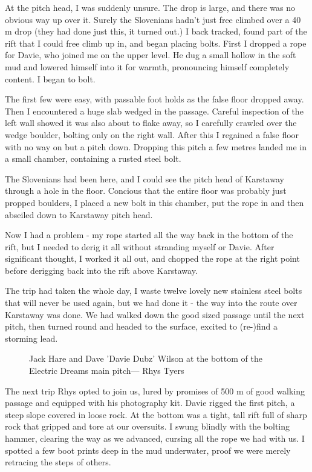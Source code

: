 At the pitch head, I was suddenly unsure. The drop is large, and there was no obvious way up over it. Surely the Slovenians hadn’t just free climbed over a 40 m drop (they had done just this, it turned out.) I back tracked, found part of the rift that I could free climb up in, and began placing bolts. First I dropped a rope for Davie, who joined me on the upper level. He dug a small hollow in the soft mud and lowered himself into it for warmth, pronouncing himself completely content. I began to bolt.

The first few were easy, with passable foot holds as the false floor dropped away. Then I encountered a huge slab wedged in the passage. Careful inspection of the left wall showed it was also about to flake away, so I carefully crawled over the wedge boulder, bolting only on the right wall. After this I regained a false floor with no way on but a pitch down. Dropping this pitch a few metres landed me in a small chamber, containing a rusted steel bolt.

The Slovenians had been here, and I could see the pitch head of Karstaway through a hole in the floor. Concious that the entire floor was probably just propped boulders, I placed a new bolt in this chamber, put the rope in and then abseiled down to Karstaway pitch head.

Now I had a problem - my rope started all the way back in the bottom of the rift, but I needed to derig it all without stranding myself or Davie. After significant thought, I worked it all out, and chopped the rope at the right point before derigging back into the rift above Karstaway. 

The trip had taken the whole day, I waste twelve lovely new stainless steel bolts that will never be used again, but we had done it - the way into the route over Karstaway was done. We had walked down the good sized passage until the next pitch, then turned round and headed to the surface, excited to (re-)find a storming lead.

\begin{figure}[t!]
\checkoddpage \ifoddpage \forcerectofloat \else \forceversofloat \fi
\centering
{}
\caption{Jack Hare and Dave 'Davie Dubz' Wilson at the bottom of the Electric Dreams main pitch--- Rhys Tyers}
\label{Elecdreams}
\end{figure}




The next trip Rhys opted to join us, lured by promises of 500 m of good walking passage and equipped with his photography kit. Davie rigged the first pitch, a steep slope covered in loose rock. At the bottom was a tight, tall rift full of sharp rock that gripped and tore at our oversuits. I swung blindly with the bolting hammer, clearing the way as we advanced, cursing all the rope we had with us. I spotted a few boot prints deep in the mud underwater, proof we were merely retracing the steps of others.



